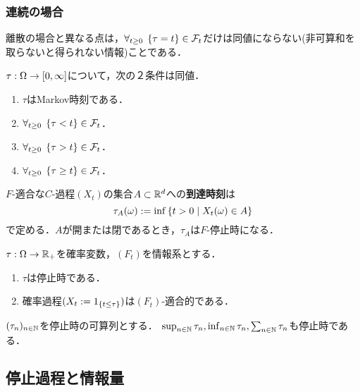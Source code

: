 \documentclass[uplatex,dvipdfmx]{jsreport}
\begin{document}
\subsubsection{連続の場合}

\begin{tcolorbox}[colframe=ForestGreen, colback=ForestGreen!10!white,breakable,colbacktitle=ForestGreen!40!white,coltitle=black,fonttitle=\bfseries\sffamily,
title=]
    離散の場合と異なる点は，$\forall_{t\ge0}\;\left\{\tau=t\right\}\in\mathcal{F}_t$だけは同値にならない(非可算和を取らないと得られない情報)ことである．
\end{tcolorbox}

\begin{lemma}[連続の場合の特徴付け]
    $\tau:\Omega\to[0,\infty]$について，次の２条件は同値．
    \begin{enumerate}
        \item $\tau$はMarkov時刻である．
        \item $\forall_{t\ge0}\;\left\{\tau<t\right\}\in\mathcal{F}_t$．
        \item $\forall_{t\ge0}\;\left\{\tau>t\right\}\in\mathcal{F}_t$．
        \item $\forall_{t\ge0}\;\left\{\tau\ge t\right\}\in\mathcal{F}_t$．
    \end{enumerate}
\end{lemma}

\begin{example}
    $F$-適合な$C$-過程$(X_t)$の集合$A\subset\mathbb{R}^d$への\textbf{到達時刻}は
    \[\tau_A(\omega):=\inf\left\{t>0\mid X_t(\omega)\in A\right\}\]
    で定める．$A$が開または閉であるとき，$\tau_A$は$F$-停止時になる．
\end{example}

\begin{lemma}[特徴付け]
    $\tau:\Omega\to\mathbb{R}_+$を確率変数，$(F_t)$を情報系とする．
    \begin{enumerate}
        \item $\tau$は停止時である．
        \item 確率過程$(X_t:=1_{\left\{t\le\tau\right\}})$は$(F_t)$-適合的である．
    \end{enumerate}
\end{lemma}

\begin{proposition}[構成]
    $(\tau_n)_{n\in\mathbb{N}}$を停止時の可算列とする．
    $\sup_{n\in\mathbb{N}}\tau_n,\inf_{n\in\mathbb{N}}\tau_n,\sum_{n\in\mathbb{N}}\tau_n$も停止時である．
\end{proposition}

\subsection{停止過程と情報量}
\end{document}
